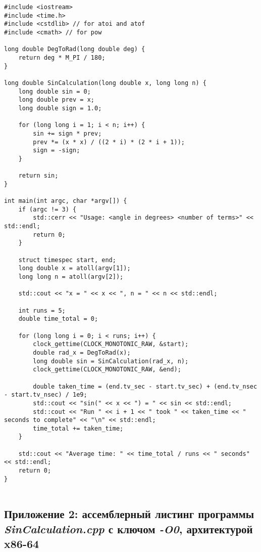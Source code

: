 \documentclass[12pt,a4paper]{article}
\numberwithin{subsection}{section}
\begin{document}
\begin{lstlisting}
#include <iostream>
#include <time.h>
#include <cstdlib> // for atoi and atof
#include <cmath> // for pow

long double DegToRad(long double deg) {
    return deg * M_PI / 180;
}

long double SinCalculation(long double x, long long n) {
    long double sin = 0;
    long double prev = x;
    long double sign = 1.0;

    for (long long i = 1; i < n; i++) {
        sin += sign * prev;
        prev *= (x * x) / ((2 * i) * (2 * i + 1));
        sign = -sign;
    }

    return sin;
}

int main(int argc, char *argv[]) {
    if (argc != 3) {
        std::cerr << "Usage: <angle in degrees> <number of terms>" << std::endl;
        return 0;
    }

    struct timespec start, end;
    long double x = atoll(argv[1]);
    long long n = atoll(argv[2]);

    std::cout << "x = " << x << ", n = " << n << std::endl;

    int runs = 5;
    double time_total = 0;

    for (long long i = 0; i < runs; i++) {
        clock_gettime(CLOCK_MONOTONIC_RAW, &start);
        double rad_x = DegToRad(x);
        long double sin = SinCalculation(rad_x, n);
        clock_gettime(CLOCK_MONOTONIC_RAW, &end);

        double taken_time = (end.tv_sec - start.tv_sec) + (end.tv_nsec - start.tv_nsec) / 1e9;
        std::cout << "sin(" << x << ") = " << sin << std::endl;
        std::cout << "Run " << i + 1 << " took " << taken_time << " seconds to complete" << "\n" << std::endl;
        time_total += taken_time;
    }

    std::cout << "Average time: " << time_total / runs << " seconds" << std::endl;
    return 0;
}
        
\end{lstlisting}

\subsection*{Приложение 2: ассемблерный листинг программы \textit{SinCalculation.cpp} с 
ключом \textit{-O0}, архитектурой x86-64}\label{app:app2}
\end{document}
